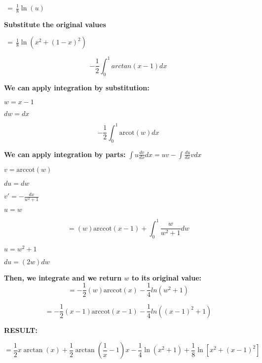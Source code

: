 \documentclass{article}
\begin{document}
\bigskip $\ = \, \frac{1}{8} \ln (u) $\

\bigskip \textbf{Substitute the original values}

\bigskip $\ = \, \frac{1}{8} \ln (x^2+(1-x)^2)  $


\begin{equation*}
   -\frac{1}{2}\int_{0}^{1} arctan(x-1)dx
\end{equation*}

\bigskip\textbf{We can apply integration by substitution:}
\begin{list}{}{}
       \item $w=x-1$  
       \item $dw=dx$
\end{list}

\begin{equation*}
   -\frac{1}{2}\int_{0}^{1}\textrm{arcot}(w)dx
\end{equation*}

\bigskip\textbf{We can apply integration by parts:} $\int {u\frac{{dv}}{{dx}}} dx = uv - \int {\frac{{du}}{{dx}}} vdx$ 
\begin{list}{}{}
       \item $v=\textrm{arccot}(w)$
       \item $du = dw$
       \item $v'=-\frac{dx}{w^2+1}
$
       \item $u=w$
\end{list}

\begin{equation*}
   =(w)\textrm{arccot}(x-1)+\int_{0}^{1}\frac{w}{w^2+1}dw
\end{equation*}
\begin{list}{}{}
       \item $u=w^2+1$
       \item $du=(2w)dw$
\end{list}

\bigskip\textbf{Then, we integrate and we return $w$ to its original value:}
\begin{equation*}
   =-\frac{1}{2}(w)\textrm{arccot}(x)-\frac{1}{4}ln(w^2+1)
\end{equation*}

\begin{equation*}
   =-\frac{1}{2}(x-1)\textrm{arccot}(x-1)-\frac{1}{4}ln((x-1)^2+1)
\end{equation*}

\bigskip \textbf{RESULT:}

\begin{equation*}
    =\frac{1}{2} x \arctan(x) +\frac{1}{2} \arctan(\frac{1}{x}-1) x -\frac{1}{4} \ln{(x^2 +1)} +\frac{1}{8} \ln{[x^2 +(x-1)^2]}
\end{equation*}
\end{document}
